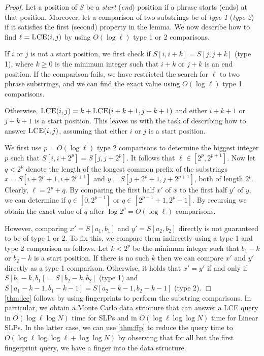 \documentclass[11pt]{article}
\newcommand{\qed}{\hfill\ensuremath{\Box}\medskip\\\noindent}
\newenvironment{proof}{\noindent\emph{Proof. }}
\newcommand{\lceq}{\ensuremath{\textsc{LCE}}}
\begin{document}
\begin{proof}
Let a position of $S$ be a \emph{start} (\emph{end}) position if a phrase starts (ends) at that position. Moreover, let a comparison of two substrings be of \emph{type 1} (\emph{type 2}) if it satisfies the first (second) property in the lemma. We now describe how to find $\ell = \lceq(i,j)$ by using $O(\log \ell)$ type 1 or 2 comparisons.

If $i$ or $j$ is not a start position, we first check if $S[i,i+k] = S[j,j+k]$ (type 1), where $k \geq 0$ is the minimum integer such that $i+k$ or $j+k$ is an end position. If the comparison fails, we have restricted the search for $\ell$ to two phrase substrings, and we can find the exact value using $O(\log \ell)$ type 1 comparisons.

Otherwise, $\lceq(i,j) = k + \lceq(i+k+1,j+k+1)$ and either $i+k+1$ or $j+k+1$ is a start position. This leaves us with the task of describing how to answer $\lceq(i,j)$, assuming that either $i$ or $j$ is a start position.

We first use $p=O(\log \ell)$ type 2 comparisons to determine the biggest integer $p$ such that $S[i , i+2^p] = S[j , j+2^p]$. It follows that $\ell \in [2^p, 2^{p+1}]$. Now let $q<2^p$ denote the length of the longest common prefix of the substrings $x=S[i+2^p+1 , i+2^{p+1}]$ and $y=S[j+2^p+1 , j+2^{p+1}]$, both of length $2^p$. Clearly, $\ell = 2^p + q$. By comparing the first half $x'$ of $x$ to the first half $y'$ of $y$, we can determine if $q \in [0,2^{p-1}]$ or $q \in [2^{p-1}+1,2^p-1]$. By recursing we obtain the exact value of $q$ after $\log 2^p = O(\log \ell)$ comparisons.

However, comparing $x'=S[a_1,b_1]$ and $y'=S[a_2,b_2]$ directly is not guaranteed to be of type 1 or 2. To fix this, we compare them indirectly using a type 1 and type 2 comparison as follows. Let $k < 2^p$ be the minimum integer such that $b_1-k$ or $b_2-k$ is a start position. If there is no such $k$ then we can compare $x'$ and $y'$ directly as a type 1 comparison. Otherwise, it holds that $x' = y'$ if and only if $S[b_1-k,b_1] = S[b_2-k,b_2]$ (type 1) and $S[a_1-k-1,b_1-k-1] = S[a_2-k-1,b_2-k-1]$ (type 2).
\qed
\end{proof}


\noindent \autoref{thm:lce} follows by using fingerprints to perform the substring comparisons. In particular, we obtain a Monte Carlo data structure that can answer a LCE query in $O(\log\ell \log N)$ time for SLPs and in $O(\log \ell \log\log N)$ time for Linear SLPs. In the latter case, we can use \autoref{thm:ffp} to reduce the query time to $O(\log\ell\log\log\ell + \log\log N)$ by observing that for all but the first fingerprint query, we have a finger into the data structure. 
\end{document}
